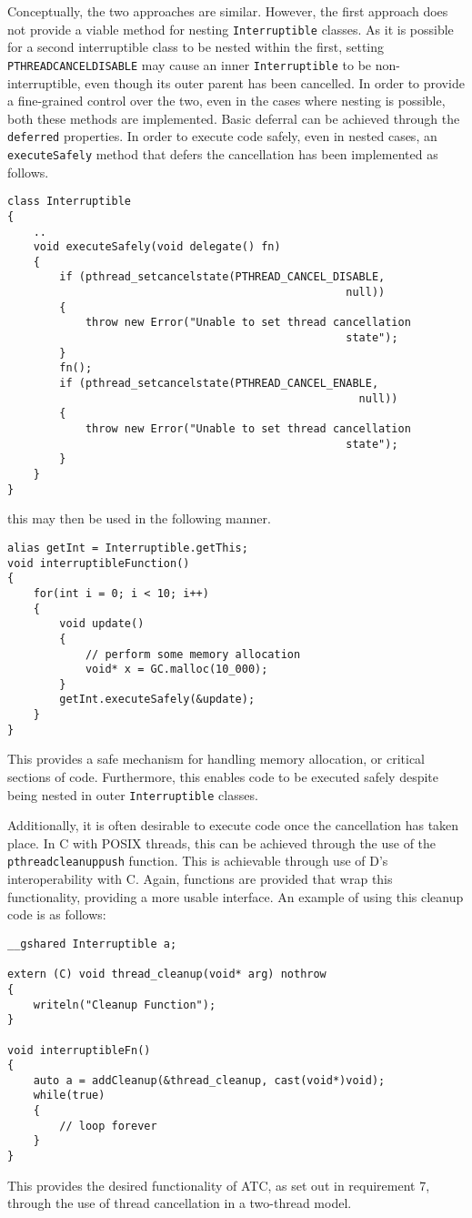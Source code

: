 Conceptually, the two approaches are similar. However, the first approach does 
not provide a viable method for nesting \texttt{Interruptible} classes. As it is 
possible for a second interruptible class to be nested within the first, setting 
\texttt{PTHREAD\textunderscore{}CANCEL\textunderscore{}DISABLE} may cause an 
inner \texttt{Interruptible} to be non-interruptible, even though its outer parent 
has been cancelled. In order to provide a fine-grained control over the two, 
even in the cases where nesting is possible, both these methods are implemented. 
Basic deferral can be achieved through the \texttt{deferred} properties. In order 
to execute code safely, even in nested cases, an \texttt{executeSafely} method that 
defers the cancellation has been implemented as follows. 
\begin{lstlisting}
class Interruptible
{
    ..
    void executeSafely(void delegate() fn)
    {
        if (pthread_setcancelstate(PTHREAD_CANCEL_DISABLE, 
                                                    null))
        {
            throw new Error("Unable to set thread cancellation 
                                                    state");
        }
        fn();
        if (pthread_setcancelstate(PTHREAD_CANCEL_ENABLE, 
                                                      null))
        {
            throw new Error("Unable to set thread cancellation 
                                                    state");
        }
    }
}
\end{lstlisting}
this may then be used in the following manner. 
\begin{lstlisting}
alias getInt = Interruptible.getThis;
void interruptibleFunction() 
{
    for(int i = 0; i < 10; i++)
    {
        void update() 
        {
            // perform some memory allocation
            void* x = GC.malloc(10_000); 
        }
        getInt.executeSafely(&update);
    }
}
\end{lstlisting}
This provides a safe mechanism for handling memory allocation, or critical sections 
of code. Furthermore, this enables code to be executed safely despite being 
nested in outer \texttt{Interruptible} classes. 
\par\bigskip\noindent
Additionally, it is often desirable to execute code once the cancellation has taken 
place. In C with POSIX threads, this can be achieved through the use of the 
\texttt{pthread\textunderscore{}cleanup\textunderscore{}push} function. 
This is achievable through use of D's interoperability with C. Again, functions are provided 
that wrap this functionality, providing a more usable interface. An example of using 
this cleanup code is as follows: 
\begin{lstlisting}
__gshared Interruptible a; 

extern (C) void thread_cleanup(void* arg) nothrow
{
    writeln("Cleanup Function");
}

void interruptibleFn()
{
    auto a = addCleanup(&thread_cleanup, cast(void*)void);
    while(true)
    {
        // loop forever
    }
}
\end{lstlisting}
This provides the desired functionality of ATC, as set out in requirement 7, 
through the use of thread cancellation in a two-thread model.

